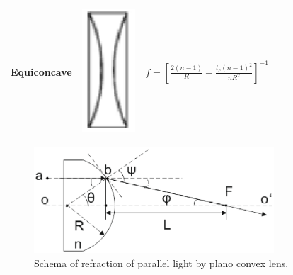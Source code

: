 \begin{table}[!ht]
\begin{tabular}{|c|c|c|}
\hline
Equiconcave & \parbox[c]{2.1cm}{\includegraphics[width=2cm]{bilder/equi_concave}} & $f=\left[\frac{2(n-1)}{R} + \frac{t_{c}(n-1)^2}{nR^2}\right]^{-1}$ \\
\hline
\end{tabular}
\label{tab:lenses_focal_length}
\end{table}
\begin{figure}[!ht]
\centering
\includegraphics[width=0.8\textwidth]{bilder/focal_length}
\caption{Schema of refraction of parallel light by plano convex lens.}
\label{fig:focal_length}
\end{figure}

